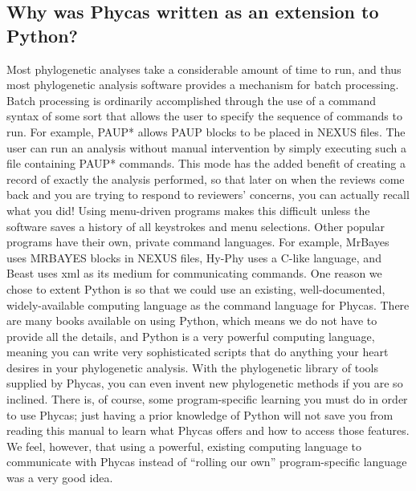 \documentclass[10pt]{article}
\begin{document}
\subsection{Why was Phycas written as an extension to Python?}
Most phylogenetic analyses take a considerable amount of time to run, and thus most phylogenetic analysis software provides a mechanism for batch processing. 
Batch processing is ordinarily accomplished through the use of a command syntax of some sort that allows the user to specify the sequence of commands to run. For example, PAUP* allows PAUP blocks to be placed in NEXUS files. The user can run an analysis without manual intervention by simply executing such a file containing PAUP* commands. 
This mode has the added benefit of creating a record of exactly the analysis performed, so that later on when the reviews come back and you are trying to respond to reviewers' concerns, you can actually recall what you did! 
Using menu-driven programs makes this difficult unless the software saves a history of all keystrokes and menu selections. 
Other popular programs have their own, private command languages. 
For example, MrBayes uses MRBAYES blocks in NEXUS files, Hy-Phy uses a C-like language, and Beast uses xml as its medium for communicating commands. One reason we chose to extent Python is so that we could use an existing, well-documented, widely-available computing language as the command language for Phycas. There are many books available on using Python, which means we do not have to provide all the details, and Python is a very powerful computing language, meaning you can write very sophisticated scripts that do anything your heart desires in your phylogenetic analysis. With the phylogenetic library of tools supplied by Phycas, you can even invent new phylogenetic methods if you are so inclined. 
There is, of course, some program-specific learning you must do in order to use Phycas; just having a prior knowledge of Python will not save you from reading this manual to learn what Phycas offers and how to access those features.
We feel, however, that using a powerful, existing computing language to communicate with Phycas instead of ``rolling our own'' program-specific language was a very good idea.

\end{document}
